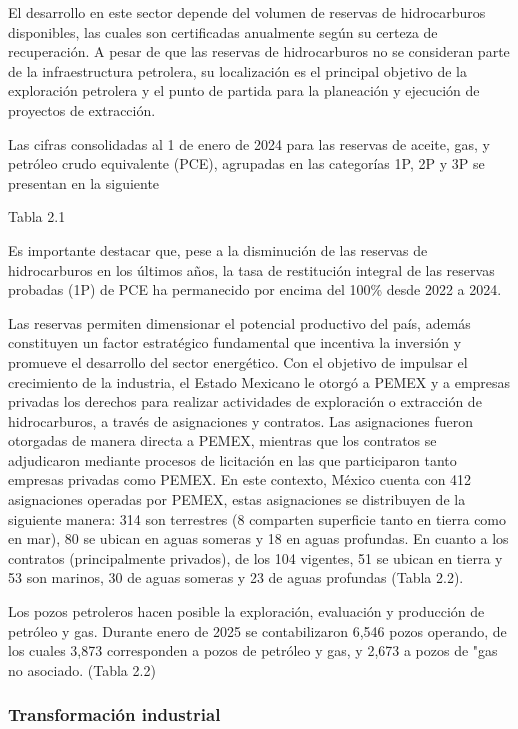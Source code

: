 \documentclass{sener2025}
\begin{document}
El desarrollo en este sector depende del volumen de reservas de hidrocarburos disponibles, las cuales son certificadas anualmente según su certeza de recuperación. A pesar de que las reservas de hidrocarburos no se consideran parte de la infraestructura petrolera, su localización es el principal objetivo de la exploración petrolera y el punto de partida para la planeación y ejecución de proyectos de extracción.

Las cifras consolidadas al 1 de enero de 2024 para las reservas de aceite, gas, y petróleo crudo equivalente (PCE), agrupadas en las categorías 1P, 2P y 3P se presentan en la siguiente

Tabla 2.1

Es importante destacar que, pese a la disminución de las reservas de hidrocarburos en los últimos años, la tasa de restitución integral de las reservas probadas (1P) de PCE ha permanecido por encima del 100\% desde 2022 a 2024.

Las reservas permiten dimensionar el potencial productivo del país, además constituyen un factor estratégico fundamental que incentiva la inversión y promueve el desarrollo del sector energético. Con el objetivo de impulsar el crecimiento de la industria, el Estado Mexicano le otorgó a PEMEX y a empresas privadas los derechos para realizar actividades de exploración o extracción de hidrocarburos, a través de asignaciones y contratos. Las asignaciones fueron otorgadas de manera directa a PEMEX, mientras que los contratos se adjudicaron mediante procesos de licitación en las que participaron tanto empresas privadas como PEMEX. En este contexto, México cuenta con 412 asignaciones operadas por PEMEX, estas asignaciones se distribuyen de la siguiente manera: 314 son terrestres (8 comparten superficie tanto en tierra como en mar), 80 se ubican en aguas someras y 18 en aguas profundas. En cuanto a los contratos (principalmente privados), de los 104 vigentes, 51 se ubican en tierra y 53 son marinos, 30 de aguas someras y 23 de aguas profundas (Tabla 2.2).

Los pozos petroleros hacen posible la exploración, evaluación y producción de petróleo y gas. Durante enero de 2025 se contabilizaron 6,546 pozos operando, de los cuales 3,873 corresponden a pozos de petróleo y gas, y 2,673 a pozos de "gas no asociado. (Tabla 2.2)


\subsubsection{Transformación industrial}
\end{document}
